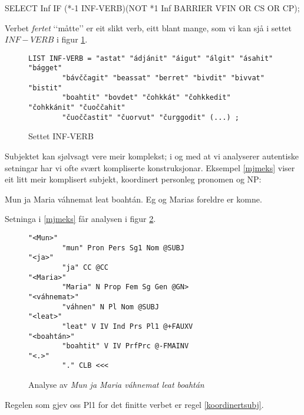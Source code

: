 \documentclass[a4paper,norsk]{article}
\begin{document}
\begin{example}\label{infverbregel}
SELECT Inf IF (*-1 INF-VERB)(NOT *1 Inf BARRIER VFIN OR CS OR CP);
\end{example}

Verbet \textit{fertet} ‘‘måtte’’ er eit slikt verb, eitt blant mange, som vi kan sjå i settet $INF-VERB$ i figur \ref{infverbsett}. %


\begin{figure}[htbp]
\begin{center}
\begin{verbatim}
LIST INF-VERB = "astat" "ádjánit" "áigut" "álgit" "ásahit" "bágget" 
		"bávččagit" "beassat" "berret" "bivdit" "bivvat" "bistit" 
		"boahtit" "bovdet" "čohkkát" "čohkkedit" "čohkkánit" "čuoččahit" 
		"čuoččastit" "čuorvut" "čurggodit" (...) ;
\end{verbatim}
\caption{Settet INF-VERB}
\label{infverbsett}
\end{center}
\end{figure}

Subjektet kan sjølvsagt vere meir komplekst; i og med at vi analyserer autentiske setningar har vi ofte svært kompliserte konstruksjonar. Eksempel \ref{mjmeks} viser eit litt meir komplisert subjekt, koordinert personleg pronomen og NP: %

\begin{example}\label{mjmeks}
\gll Mun ja Maria váhnemat  leat boahtán.
     Eg  og Marias foreldre er   komne.
\gln     
\glend
\end{example}%


Setninga i \ref{mjmeks} får analysen i figur \ref{mjam}. %

\begin{figure}[htbp]
\begin{center}
\begin{verbatim}
"<Mun>"
        "mun" Pron Pers Sg1 Nom @SUBJ
"<ja>"
        "ja" CC @CC
"<Maria>"
        "Maria" N Prop Fem Sg Gen @GN>
"<váhnemat>"
        "váhnen" N Pl Nom @SUBJ
"<leat>"
        "leat" V IV Ind Prs Pl1 @+FAUXV
"<boahtán>"
        "boahtit" V IV PrfPrc @-FMAINV
"<.>"
        "." CLB <<<
\end{verbatim}
\caption{Analyse av \textit{Mun ja Maria váhnemat leat boahtán}}
\label{mjam}
\end{center}
\end{figure}

 
Regelen som gjev oss Pl1 for det finitte verbet er regel  \ref{koordinertsubj}. %
 
\end{document}
